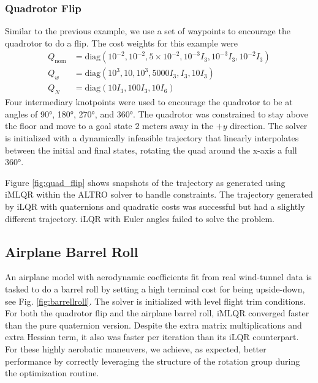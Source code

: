 \documentclass[letterpaper, 10 pt, conference]{ieeeconf}  %
\begin{document}
        \subsubsection{Quadrotor Flip}
	    Similar to the previous example, we use a set of waypoints to encourage the
	    quadrotor to do a flip. The cost weights for this example were
	    \begin{align*}
	        Q_\text{nom} &= \text{diag}(10^{-2},10^{-2},5 \!\times\! 10^{-2}, 10^{-3} I_3,
    	        10^{-3} I_3, 10^{-2} I_3) \\
	        Q_w &= \text{diag}(10^3, 10, 10^3, 5000 I_3, I_3, 10 I_3) \\
	        Q_N &= \text{diag}(10 I_3, 100 I_3, 10 I_6)  
	    \end{align*}
	    Four intermediary knotpoints were used to encourage the quadrotor to be at angles
	    of \ang{90}, \ang{180}, \ang{270}, and \ang{360}. The quadrotor was constrained
	    to stay above the floor and move to a goal state 2 meters away in the $+y$
	    direction. The solver is initialized with a dynamically infeasible trajectory
	    that linearly interpolates between the initial and final states, rotating the
	    quad around the x-axis a full \ang{360}.
	    
	    Figure \ref{fig:quad_flip} shows snapshots of the trajectory as generated using
	    iMLQR within the ALTRO solver to handle constraints. The trajectory generated by
	    iLQR with quaternions and quadratic costs was successful but had a slightly
        different trajectory. iLQR with Euler angles failed to solve the problem.

        \subsection{Airplane Barrel Roll}
        An airplane model with aerodynamic coefficients fit from real wind-tunnel data is
        tasked to do a barrel roll by setting a high terminal cost for being upside-down,
        see Fig. \ref{fig:barrellroll}. The solver is initialized with level flight trim
        conditions. For both the quadrotor flip and the airplane barrel roll, iMLQR
        converged faster than the pure quaternion version. Despite the extra matrix
        multiplications and extra Hessian term, it also was faster per iteration than its
        iLQR counterpart. For these highly aerobatic maneuvers, we achieve, as expected,
        better performance by correctly leveraging the structure of the rotation group
        during the optimization routine.
\end{document}
